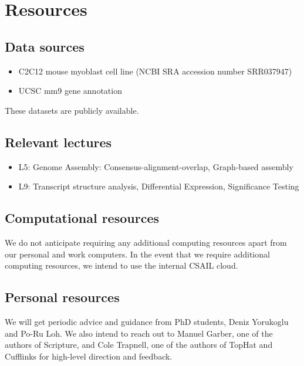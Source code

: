 \documentclass[12pt]{article}
\begin{document}

\section*{Resources}
\subsection*{Data sources}
\begin{itemize}
\item C2C12 mouse myoblast cell line (NCBI SRA accession number SRR037947) \citep{trapnell2010transcript}
\item UCSC mm9 gene annotation \citep{karolchik2008ucsc}
\end{itemize}
These datasets are publicly available.
\subsection*{Relevant lectures}
\begin{itemize}
\item L5: Genome Assembly: Consensus-alignment-overlap, Graph-based assembly
\item L9: Transcript structure analysis, Differential Expression, Significance Testing
\end{itemize}
\subsection*{Computational resources}
We do not anticipate requiring any additional computing resources apart from our personal and work computers. In the event that we require additional computing resources, we intend to use the internal CSAIL cloud.
\subsection*{Personal resources}
We will get periodic advice and guidance from PhD students, Deniz Yorukoglu and Po-Ru Loh. We also intend to reach out to Manuel Garber, one of the authors of Scripture, and Cole Trapnell, one of the authors of TopHat and Cufflinks for high-level direction and feedback.
\newpage


\end{document}
